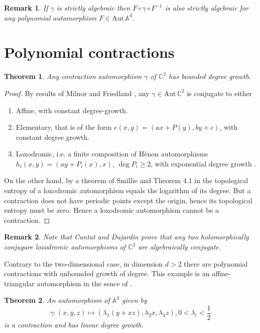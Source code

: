 \documentclass[12pt]{article}
\newtheorem{theorem}{Theorem}
\newtheorem{remark}{Remark}
\newcommand{\aut}{\mathrm{Aut\,}}
\begin{document}
\begin{remark}
If $ \gamma $ is strictly algebraic then $F\circ \gamma\circ F^{-1}$ is also strictly algebraic for any polynomial automorphism $F\in \aut \mathbb A^d  $.
\end{remark}


\section{Polynomial contractions}

\begin{theorem}
Any contraction automorphism $\gamma$ of $\mathbb C^2$ has bounded degree growth.
\end{theorem}
\begin{proof}
By results of Milnor and Friedland \cite{FM}, any $\gamma\in\aut \mathbb C^2$ is conjugate to either
\begin{enumerate}
\item Affine, with constant degree-growth.
\item Elementary, that is of the form $e(x,y)=(ax+P(y),by+c)$, with constant degree growth.
\item Loxodromic, i.e. a finite composition of Hénon automorphisms $h_i(x,y)=(ay+P_i(x),x)$, $ \deg P_i\ge 2 $, with exponential degree growth .
\end{enumerate}

On the other hand, by a theorem of Smillie \cite{smillie} and Theorem 4.1 in \cite{FM} the topological entropy of a loxodromic automorphism equals the logarithm of its degree. But a contraction does not have periodic points except the origin, hence its topological entropy must be zero. Hence a loxodromic automorphism cannot be a contraction.
\end{proof}

\begin{remark}
Note that Cantat and Dujardin \cite{cantat} prove that any two holomorphically conjugare loxodromic automorphisms of $\mathbb C^2$ are algebraically conjugate.
\end{remark}


Contrary to the two-dimensional case, in dimension $ d>2 $ there are polynomial contractions with unbounded growth of degree. This example is an affine-triangular automorphism in the sence of \cite{blanc}.

\begin{theorem}
An automorphism of $\mathbb A^3$ given by
$$\gamma: (x,y,z)\mapsto  \left(\lambda_1(y+xz),\lambda_2 x,\lambda_3 z\right), 0<\lambda_i<\frac{1}{2} $$
is a contraction and has linear degree growth.
\end{theorem}
\end{document}
